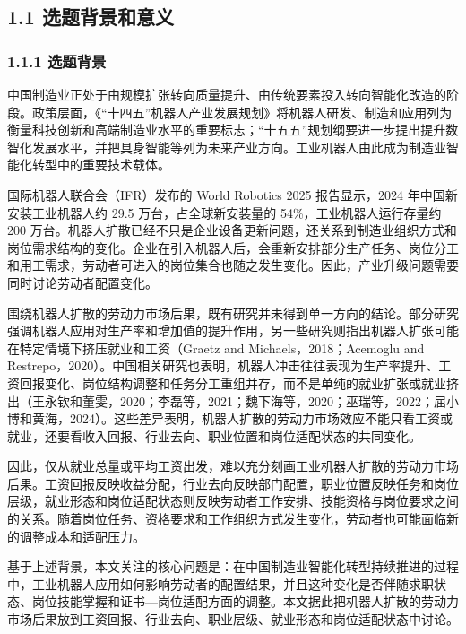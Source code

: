 \subsection{1.1 选题背景和意义}\label{ux9009ux9898ux80ccux666fux548cux610fux4e49}

\subsubsection{1.1.1 选题背景}\label{ux9009ux9898ux80ccux666f}

中国制造业正处于由规模扩张转向质量提升、由传统要素投入转向智能化改造的阶段。政策层面，《``十四五''机器人产业发展规划》将机器人研发、制造和应用列为衡量科技创新和高端制造业水平的重要标志；``十五五''规划纲要进一步提出提升数智化发展水平，并把具身智能等列为未来产业方向。工业机器人由此成为制造业智能化转型中的重要技术载体。

国际机器人联合会（IFR）发布的 World Robotics 2025 报告显示，2024 年中国新安装工业机器人约 29.5 万台，占全球新安装量的 54\%，工业机器人运行存量约 200 万台。机器人扩散已经不只是企业设备更新问题，还关系到制造业组织方式和岗位需求结构的变化。企业在引入机器人后，会重新安排部分生产任务、岗位分工和用工需求，劳动者可进入的岗位集合也随之发生变化。因此，产业升级问题需要同时讨论劳动者配置变化。

围绕机器人扩散的劳动力市场后果，既有研究并未得到单一方向的结论。部分研究强调机器人应用对生产率和增加值的提升作用，另一些研究则指出机器人扩张可能在特定情境下挤压就业和工资（Graetz and Michaels，2018；Acemoglu and Restrepo，2020）。中国相关研究也表明，机器人冲击往往表现为生产率提升、工资回报变化、岗位结构调整和任务分工重组并存，而不是单纯的就业扩张或就业挤出（王永钦和董雯，2020；李磊等，2021；魏下海等，2020；巫瑞等，2022；屈小博和黄海，2024）。这些差异表明，机器人扩散的劳动力市场效应不能只看工资或就业，还要看收入回报、行业去向、职业位置和岗位适配状态的共同变化。

因此，仅从就业总量或平均工资出发，难以充分刻画工业机器人扩散的劳动力市场后果。工资回报反映收益分配，行业去向反映部门配置，职业位置反映任务和岗位层级，就业形态和岗位适配状态则反映劳动者工作安排、技能资格与岗位要求之间的关系。随着岗位任务、资格要求和工作组织方式发生变化，劳动者也可能面临新的调整成本和适配压力。

基于上述背景，本文关注的核心问题是：在中国制造业智能化转型持续推进的过程中，工业机器人应用如何影响劳动者的配置结果，并且这种变化是否伴随求职状态、岗位技能掌握和证书---岗位适配方面的调整。本文据此把机器人扩散的劳动力市场后果放到工资回报、行业去向、职业层级、就业形态和岗位适配状态中讨论。

